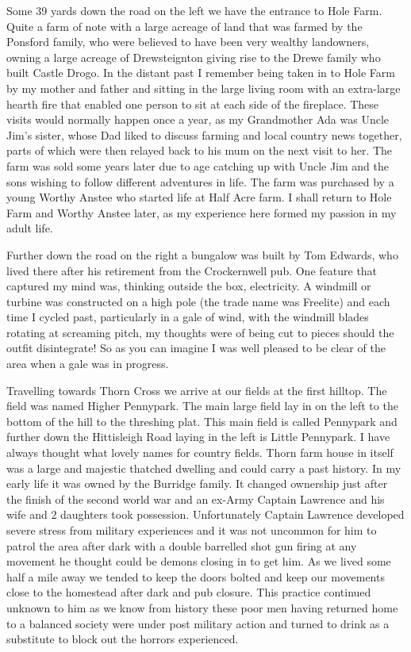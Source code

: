 Some 39 yards down the road on the left we have the entrance to Hole Farm. Quite
a farm of note with a large acreage of land that was farmed by the Ponsford
family, who were believed to have been very wealthy landowners, owning a large
acreage of Drewsteignton giving rise to the Drewe family who built Castle
Drogo. In the distant past I remember being taken in to Hole Farm by my mother
and father and sitting in the large living room with an extra-large hearth fire
that enabled one person to sit at each side of the fireplace. These visits
would normally happen once a year, as my Grandmother Ada was Uncle Jim's
sister, whose Dad liked to discuss farming and local country news together,
parts of which were then relayed back to his mum on the next visit to her. The
farm was sold some years later due to age catching up with Uncle Jim and the
sons wishing to follow different adventures in life. The farm was purchased by
a young Worthy Anstee who started life at Half Acre farm. I shall return to
Hole Farm and Worthy Anstee later, as my experience here formed my passion in my
adult life.

Further down the road on the right a bungalow was built by Tom Edwards, who
lived there after his retirement from the Crockernwell pub. One feature that
captured my mind was, thinking outside the box, electricity. A windmill or
turbine was constructed on a high pole (the trade name was Freelite) and each
time I cycled past, particularly in a gale of wind, with the windmill blades
rotating at screaming pitch, my thoughts were of being cut to pieces should the
outfit disintegrate! So as you can imagine I was well pleased to be clear of
the area when a gale was in progress.

\here
Travelling towards Thorn Cross we arrive at our fields at the first hilltop. The
field was named Higher Pennypark. The main large field lay in on the left to
the bottom of the hill to the threshing plat. This main field is called
Pennypark and further down the Hittisleigh Road laying in the left is Little
Pennypark. I have always thought what lovely names for country fields. Thorn
farm house in itself was a large and majestic thatched dwelling and could carry
a past history. In my early life it was owned by the Burridge family. It
changed ownership just after the finish of the second world war and an ex-Army
Captain Lawrence and his wife and 2 daughters took possession. Unfortunately
Captain Lawrence developed severe stress from military experiences and it was
not uncommon for him to patrol the area after dark with a double barrelled shot
gun firing at any movement he thought could be demons closing in to get him. As
we lived some half a mile away we tended to keep the doors bolted and keep our
movements close to the homestead after dark and pub closure. This practice
continued unknown to him as we know from history these poor men having returned
home to a balanced society were under post military action and turned to drink
as a substitute to block out the horrors experienced.

